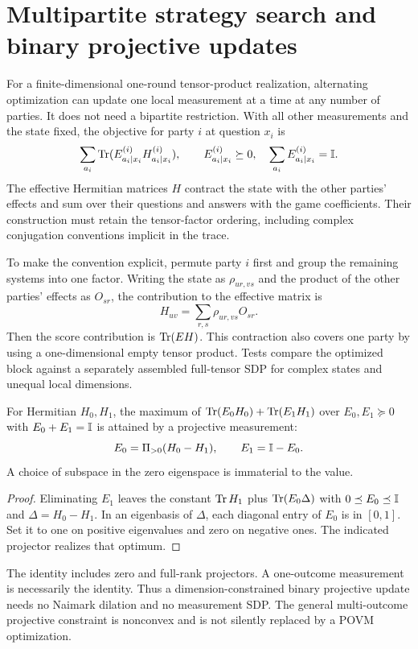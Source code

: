 \section{Multipartite strategy search and binary projective updates}
\label{sec:multipartitesearch}

For a finite-dimensional one-round tensor-product realization, alternating
optimization can update one local measurement at a time at any number of
parties. It does not need a bipartite restriction. With all other measurements
and the state fixed, the objective for party $i$ at question $x_i$ is
\[
 \sum_{a_i}\operatorname{Tr}(E^{(i)}_{a_i\mid x_i}H^{(i)}_{a_i\mid x_i}),
 \qquad E^{(i)}_{a_i\mid x_i}\succeq0,\quad
 \sum_{a_i}E^{(i)}_{a_i\mid x_i}=\mathbb I.
\]
The effective Hermitian matrices $H$ contract the state with the other
parties' effects and sum over their questions and answers with the game
coefficients. Their construction must retain the tensor-factor ordering,
including complex conjugation conventions implicit in the trace.

To make the convention explicit, permute party $i$ first and group the
remaining systems into one factor. Writing the state as
$\rho_{u r,v s}$ and the product of the other parties' effects as $O_{s r}$,
the contribution to the effective matrix is
\[
 H_{u v}=\sum_{r,s}\rho_{u r,v s}O_{s r}.
\]
Then the score contribution is $\operatorname{Tr}(EH)$. This contraction also covers one
party by using a one-dimensional empty tensor product. Tests compare the
optimized block against a separately assembled full-tensor SDP for complex
states and unequal local dimensions.

\begin{proposition}
For Hermitian $H_0,H_1$, the maximum of
$\operatorname{Tr}(E_0H_0)+\operatorname{Tr}(E_1H_1)$ over $E_0,E_1\succeq0$ with
$E_0+E_1=\mathbb I$ is attained by a projective measurement:
\[
 E_0=\Pi_{>0}(H_0-H_1),\qquad E_1=\mathbb I-E_0.
\]
A choice of subspace in the zero eigenspace is immaterial to the value.
\end{proposition}
\begin{proof}
Eliminating $E_1$ leaves the constant $\operatorname{Tr} H_1$ plus
$\operatorname{Tr}(E_0\Delta)$ with $0\preceq E_0\preceq\mathbb I$ and
$\Delta=H_0-H_1$. In an eigenbasis of $\Delta$, each diagonal entry of
$E_0$ is in $[0,1]$. Set it to one on positive eigenvalues and zero on
negative ones. The indicated projector realizes that optimum.
\end{proof}
The identity includes zero and full-rank projectors. A one-outcome
measurement is necessarily the identity. Thus a dimension-constrained
binary projective update needs no Naimark dilation and no measurement SDP.
The general multi-outcome projective constraint is nonconvex and is not
silently replaced by a POVM optimization.

